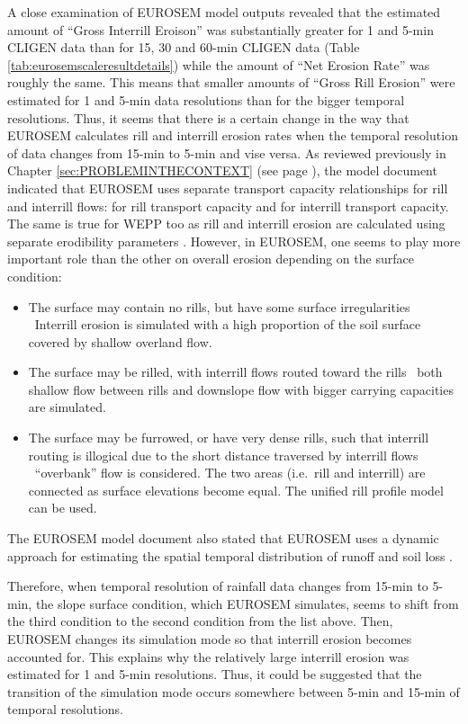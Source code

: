 A close examination of EUROSEM model outputs revealed that the estimated amount
of ``Gross Interrill Eroison'' was substantially greater for 1 and 5-min CLIGEN
data than for 15, 30 and 60-min CLIGEN data (Table
\ref{tab:eurosemscaleresultdetails}) while the amount of ``Net Erosion Rate''
was roughly the same. This means that smaller amounts of ``Gross Rill Erosion''
were estimated for 1 and 5-min data resolutions than for the bigger temporal
resolutions.
Thus, it seems that there is a certain change in the way that EUROSEM calculates
rill and interrill erosion rates when the temporal resolution of data changes
from
15-min to 5-min and vise versa.
As reviewed previously in Chapter \ref{sec:PROBLEMINTHECONTEXT} (see page
\pageref{sec:TransportCapacityOfTheFlow}), the model document
indicated that EUROSEM uses separate transport capacity relationships for rill
and interrill flows: \citet{govers1990-45} for rill transport capacity and
\citet{everaert1991-513} for interrill transport capacity. The same is true
for WEPP too as rill and interrill erosion are calculated using separate
erodibility parameters \citep{flanagan1995-usda}. However, in EUROSEM, one seems
to play more important role than the other on overall erosion depending on the
surface condition:

\begin{itemize}
  \item The surface may contain no rills, but have some surface irregularities
    \subitem \textrightarrow\ Interrill erosion is simulated with a high
proportion of the soil surface covered by shallow overland flow.
  \item The surface may be rilled, with interrill flows routed toward the rills
    \subitem \textrightarrow\ both shallow flow between rills and downslope flow
with bigger carrying capacities are simulated.
  \item The surface may be furrowed, or have very dense rills, such that
interrill routing is illogical due to the short distance traversed by interrill
flows
    \subitem \textrightarrow\ ``overbank'' flow is considered. The two areas
(i.e.\ rill and interrill) are connected as surface elevations become equal. The
unified rill profile model can be used.
\end{itemize}

The EUROSEM model document also stated that EUROSEM uses a dynamic approach for
estimating the spatial temporal distribution of runoff and soil loss
\citep{morgan1998-europeansoilerosion}.

Therefore, when temporal resolution of rainfall data changes from 15-min to
5-min,
the slope surface condition, which EUROSEM simulates, seems to shift from the
third condition to the second condition from the list above. Then, EUROSEM
changes its simulation mode so that interrill erosion becomes accounted for.
This explains why the relatively large interrill erosion was estimated for 1 and
5-min resolutions. Thus, it could be suggested that the transition of the
simulation
mode occurs somewhere between 5-min and 15-min of temporal resolutions.

